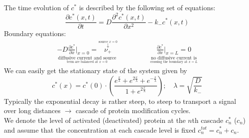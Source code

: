 The time evolution of $c^\ast$ is described by the following set of equations:
\begin{equation*}
	\frac{\partial c^\ast(x,t)}{\partial t}=D\frac{\partial^2c^\ast(x,t)}{\partial x^2}-k_-c^\ast(x,t)
\end{equation*}
Boundary equations:
\begin{align*}
	\underset{\underset{\text{term are balanced at $x=0$}}{\text{diffusive current and source}}}{-D\frac{\partial c^\ast}{\partial x}\Big|_{x=0}=\overset{\overset{\text{source $x=0$}}{\downarrow}}{\nu_+}} \qquad & \qquad \underset{\underset{\text{crossing the boundary at $x=L$}}{\text{no diffusive current is}}}{\frac{\partial c^\ast}{\partial x}\Big|_{x=L}=0}
\end{align*}
We can easily get the stationary state of the system given by
\begin{equation*}
	c^\ast(x)=c^\ast(0)\cdot\left(\frac{e^\frac{x}{\lambda}+e^{2\frac{x}{\lambda}}+e^{-\frac{x}{\lambda}}}{1+e^{2\frac{x}{\lambda}}}\right);\quad \lambda = \sqrt{\frac{D}{k_-}}
\end{equation*}
Typically the exponential decay is rather steep, to steep to transport a signal over long distances $\to$ cascade of protein modification cycles.\vspace{0.1cm}\\
We denote the level of activated (deactivated) protein at the $n$th cascade $c_n^\ast$ ($c_n$) and assume that the concentration at each cascade level is fixed $c_n^{tot}=c_n^\ast+c_n$.
